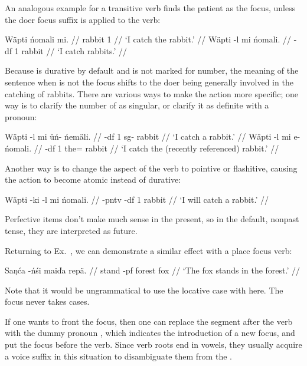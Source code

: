 \noindent An analogous example for a transitive verb finds the patient as the
focus, unless the doer focus suffix  is applied to the verb:

\pex
\a\begingl
\gla W\"apti      \'nomali mi. //
 rabbit   1 //
\glft `I catch the rabbit.' //
\endgl
\a\begingl
\gla W\"apti      -l        mi \'nomali. //
 -{\sc df} 1  rabbit //
\glft `I catch rabbits.' //
\endgl
\xe

\noindent Because  is durative by default and  is not
marked for number, the meaning of the sentence when  is not the
focus shifts to the doer being generally involved in the catching of rabbits.
There are various ways to make the action more specific; one way is to clarify
the number of  as singular, or clarify it as definite with a
pronoun:

\pex
\a\begingl
\gla W\"apti      -l        mi \"u\'n-   \'nem\"ali. //
 -{\sc df} 1  {\sc sg}- rabbit //
\glft `I catch a rabbit.' //
\endgl
\a\begingl
\gla W\"apti      -l        mi e-   \'nomali. //
 -{\sc df} 1  the= rabbit //
\glft `I catch the (recently referenced) rabbit.' //
\endgl
\xe

\noindent Another way is to change the aspect of the verb to pointive or
flashitive, causing the action to become atomic instead of durative:

\ex
\begingl
\gla W\"apti      -ki         -l        mi \'nomali. //
 -{\sc pntv} -{\sc df} 1  rabbit //
\glft `I will catch a rabbit.' //
\endgl
\xe

\noindent Perfective items don't make much sense in the present, so in the
default, nonpast tense, they are interpreted as future.

Returning to Ex.~, we can demonstrate a similar effect with
a place focus verb:

\ex
\begingl
\gla Saŋ\'ca -\'n\'si  mai\v{d}a rep\"a. //
\glb stand   -{\sc pf} forest    fox //
\glft `The fox stands in the forest.' //
\endgl
\xe

\noindent Note that it would be ungrammatical to use the locative case with
 here. The focus never takes cases.

If one wants to front the focus, then one can replace the segment after the verb
with the dummy pronoun , which indicates the introduction of a new focus,
and put the focus before the verb. Since verb roots end in vowels, they usually
acquire a voice suffix in this situation to disambiguate them from the .

